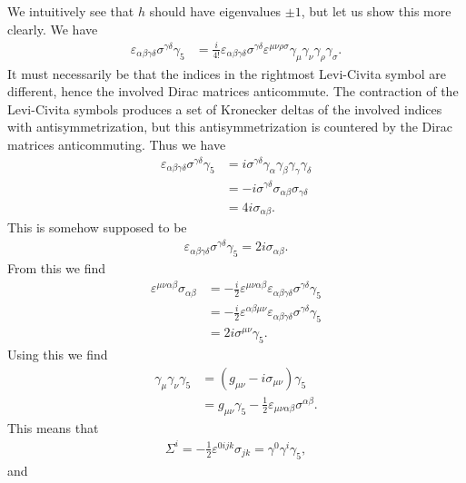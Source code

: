 We intuitively see that $h$ should have eigenvalues $\pm 1$, but let us show this more clearly. We have
\begin{align*}
	\varepsilon_{\alpha\beta\gamma\delta}\sigma^{\gamma\delta}\gamma_{5} &= \frac{i}{4!}\varepsilon_{\alpha\beta\gamma\delta}\sigma^{\gamma\delta}\varepsilon^{\mu\nu\rho\sigma}\gamma_{\mu}\gamma_{\nu}\gamma_{\rho}\gamma_{\sigma}.
\end{align*}
It must necessarily be that the indices in the rightmost Levi-Civita symbol are different, hence the involved Dirac matrices anticommute. The contraction of the Levi-Civita symbols produces a set of Kronecker deltas of the involved indices with antisymmetrization, but this antisymmetrization is countered by the Dirac matrices anticommuting. Thus we have
\begin{align*}
	\varepsilon_{\alpha\beta\gamma\delta}\sigma^{\gamma\delta}\gamma_{5} &= i\sigma^{\gamma\delta}\gamma_{\alpha}\gamma_{\beta}\gamma_{\gamma}\gamma_{\delta} \\
	&= -i\sigma^{\gamma\delta}\sigma_{\alpha\beta}\sigma_{\gamma\delta} \\
	&= 4i\sigma_{\alpha\beta}.
\end{align*}
This is somehow supposed to be
\begin{align*}
	\varepsilon_{\alpha\beta\gamma\delta}\sigma^{\gamma\delta}\gamma_{5} = 2i\sigma_{\alpha\beta}.
\end{align*}
From this we find
\begin{align*}
	\varepsilon^{\mu\nu\alpha\beta}\sigma_{\alpha\beta} &= -\frac{i}{2}\varepsilon^{\mu\nu\alpha\beta}\varepsilon_{\alpha\beta\gamma\delta}\sigma^{\gamma\delta}\gamma_{5} \\
	&= -\frac{i}{2}\varepsilon^{\alpha\beta\mu\nu}\varepsilon_{\alpha\beta\gamma\delta}\sigma^{\gamma\delta}\gamma_{5} \\
	&= 2i\sigma^{\mu\nu}\gamma_{5}.
\end{align*}
Using this we find
\begin{align*}
	\gamma_{\mu}\gamma_{\nu}\gamma_{5} &= (g_{\mu\nu} - i\sigma_{\mu\nu})\gamma_{5} \\ 
	                                   &= g_{\mu\nu}\gamma_{5} - \frac{1}{2}\varepsilon_{\mu\nu\alpha\beta}\sigma^{\alpha\beta}.
\end{align*}
This means that
\begin{align*}
	\Sigma^{i} = -\frac{1}{2}\varepsilon^{0ijk}\sigma_{jk} = \gamma^{0}\gamma^{i}\gamma_{5},
\end{align*}
and
